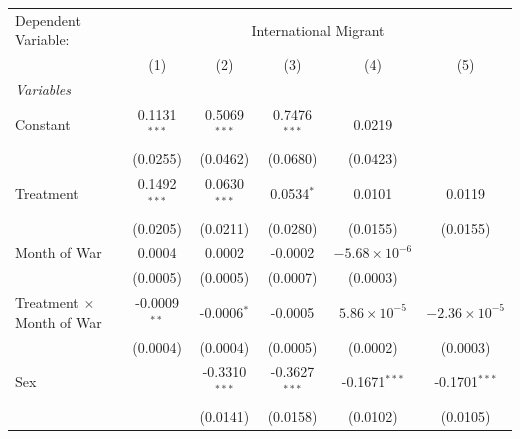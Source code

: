 
\begingroup
\centering
\renewcommand{\arraystretch}{0.75}   %
\setlength{\aboverulesep}{0pt}       %
\setlength{\belowrulesep}{0pt} 
\begin{tabular}{lccccc}
   \tabularnewline \midrule \midrule
   Dependent Variable: & \multicolumn{5}{c}{International Migrant}\\
                                      & (1)            & (2)                     & (3)                     & (4)                     & (5)\\  
   \midrule
   \emph{Variables}\\
   Constant                                    & 0.1131$^{***}$ & 0.5069$^{***}$          & 0.7476$^{***}$          & 0.0219                  &   \\   
                                               & (0.0255)       & (0.0462)                & (0.0680)                & (0.0423)                &   \\   
   Treatment                                   & 0.1492$^{***}$ & 0.0630$^{***}$          & 0.0534$^{*}$            & 0.0101                  & 0.0119\\   
                                               & (0.0205)       & (0.0211)                & (0.0280)                & (0.0155)                & (0.0155)\\   
   Month of War                              & 0.0004         & 0.0002                  & -0.0002                 & $-5.68\times 10^{-6}$   &   \\   
                                               & (0.0005)       & (0.0005)                & (0.0007)                & (0.0003)                &   \\   
   Treatment $\times$ Month of War           & -0.0009$^{**}$ & -0.0006$^{*}$           & -0.0005                 & $5.86\times 10^{-5}$    & $-2.36\times 10^{-5}$\\    
                                               & (0.0004)       & (0.0004)                & (0.0005)                & (0.0002)                & (0.0003)\\   
   Sex                                         &                & -0.3310$^{***}$         & -0.3627$^{***}$         & -0.1671$^{***}$         & -0.1701$^{***}$\\   
                                               &                & (0.0141)                & (0.0158)                & (0.0102)                & (0.0105)\\   

\end{tabular}
